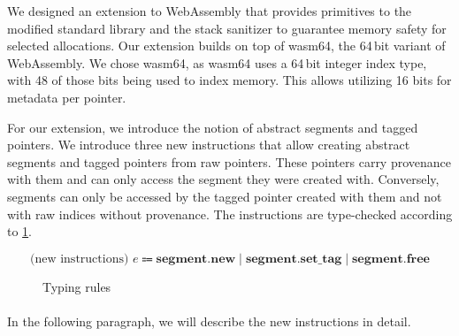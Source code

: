 We designed an extension to WebAssembly that provides primitives to the modified standard library and the stack sanitizer to guarantee memory safety for selected allocations.
Our extension builds on top of wasm64, the 64\,bit variant of WebAssembly.
We chose wasm64, as wasm64 uses a 64\,bit integer index type, with 48 of those bits being used to index memory.
This allows utilizing 16 bits for metadata per pointer.

For our extension, we introduce the notion of abstract segments and tagged pointers.
We introduce three new instructions that allow creating abstract segments and tagged pointers from raw pointers.
These pointers carry provenance with them and can only access the segment they were created with.
Conversely, segments can only be accessed by the tagged pointer created with them and not with raw indices without provenance.
The instructions are type-checked according to \cref{fig:typing-rules}.

\begin{equation*}
    \text{(new instructions) } e \Coloneqq \textbf{segment.new} \mid \textbf{segment.set\_tag} \mid \textbf{segment.free}
\end{equation*}


\begin{figure}[t]
    \begin{prooftree}
    \end{prooftree}
    \begin{prooftree}
    \end{prooftree}
    \begin{prooftree}
    \end{prooftree}
    \caption{Typing rules}
    \label{fig:typing-rules}
\end{figure}

\paragraph{}
In the following paragraph, we will describe the new instructions in detail.

